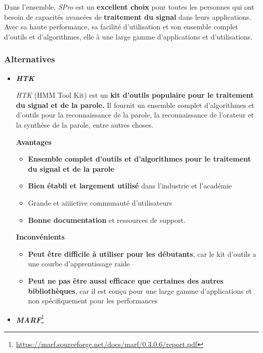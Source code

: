 Dans l'ensemble, \textit{SPro} est un \textbf{excellent choix} pour toutes les personnes qui ont besoin de capacités avancées de \textbf{traitement
      du signal} dans leurs applications. Avec sa haute performance, sa facilité d'utilisation et son ensemble complet d'outils et d'algorithmes, elle  à une
large gamme d'applications et d'utilisations.

\subsubsection{Alternatives}

\begin{itemize}
      \item \large\textbf{\textit{HTK}} \normalsize

            \textit{HTK} (HMM Tool Kit) est un \textbf{kit d'outils populaire pour le traitement du signal et de la parole.} Il fournit un ensemble complet d'algorithmes et d'outils
            pour la reconnaissance de la parole, la reconnaissance de l'orateur et la synthèse de la parole, entre autres choses.

            \textbf{Avantages}
            \begin{itemize}
                  \item \textbf{Ensemble complet d'outils et d'algorithmes pour le traitement du signal et de la parole}
                  \item \textbf{Bien établi et largement utilisé} dans l'industrie et l'académie
                  \item Grande et aiiiictive communauté d'utilisateurs
                  \item \textbf{Bonne documentation} et ressources de support.
            \end{itemize}


            \textbf{Inconvénients}
            \begin{itemize}
                  \item \textbf{Peut être difficile à utiliser pour les débutants}, car le kit d'outils a une courbe d'apprentissage raide
                  \item \textbf{Peut ne pas être aussi efficace que certaines des autres bibliothèques}, car il est conçu pour une large gamme
                        d'applications et non spécifiquement pour les performances
            \end{itemize}

      \item\large\textbf{\textit{MARF}}\normalsize\footnote{\url{https://marf.sourceforge.net/docs/marf/0.3.0.6/report.pdf}}



\end{itemize}
